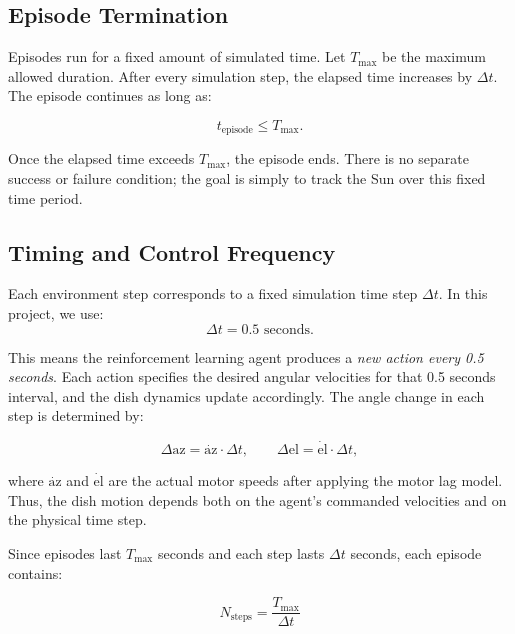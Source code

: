 \documentclass[11pt,a4paper]{article}
\begin{document}
\subsection{Episode Termination}

Episodes run for a fixed amount of simulated time.  
Let $T_{\max}$ be the maximum allowed duration.  
After every simulation step, the elapsed time increases by $\Delta t$.  
The episode continues as long as:

\begin{equation}
t_{\text{episode}} \le T_{\max}.
\end{equation}

Once the elapsed time exceeds $T_{\max}$, the episode ends.  
There is no separate success or failure condition; the goal is simply to track the Sun over this fixed time period.

\subsection{Timing and Control Frequency}

Each environment step corresponds to a fixed simulation time step $\Delta t$.  
In this project, we use:
\begin{equation}
\Delta t = 0.5 \text{ seconds}.
\end{equation}

This means the reinforcement learning agent produces a \emph{new action every 0.5 seconds}.  
Each action specifies the desired angular velocities for that 0.5 seconds interval, and the dish dynamics update accordingly.  
The angle change in each step is determined by:

\begin{equation}
\Delta \mathrm{az} = \dot{\mathrm{az}} \cdot \Delta t, \qquad
\Delta \mathrm{el} = \dot{\mathrm{el}} \cdot \Delta t,
\end{equation}

where $\dot{\mathrm{az}}$ and $\dot{\mathrm{el}}$ are the actual motor speeds after applying the motor lag model.  
Thus, the dish motion depends both on the agent's commanded velocities and on the physical time step.

Since episodes last $T_{\max}$ seconds and each step lasts $\Delta t$ seconds, each episode contains:

\begin{equation}
N_{\text{steps}} = \frac{T_{\max}}{\Delta t}
\end{equation}
\end{document}
